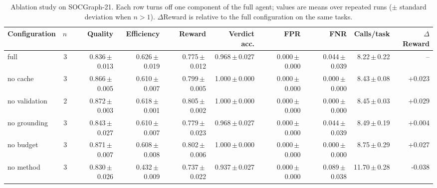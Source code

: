 \begin{table}[t]\centering\footnotesize
\caption{Ablation study on SOCGraph-21. Each row turns off one component of the full agent; values are means over repeated runs ($\pm$ standard deviation when $n>1$). $\Delta$Reward is relative to the full configuration on the same tasks.}
\label{tab:ablation}
\begin{tabular}{@{}l r rrrrrrr r@{}}\toprule
Configuration & $n$ & Quality & Efficiency & Reward & Verdict acc. & FPR & FNR & Calls/task & $\Delta$Reward\\\midrule
full & 3 & 0.836\,$\pm$\,0.013 & 0.626\,$\pm$\,0.019 & 0.775\,$\pm$\,0.012 & 0.968\,$\pm$\,0.027 & 0.000\,$\pm$\,0.000 & 0.044\,$\pm$\,0.039 & 8.22\,$\pm$\,0.22 & --\\
no cache & 3 & 0.866\,$\pm$\,0.005 & 0.610\,$\pm$\,0.007 & 0.799\,$\pm$\,0.005 & 1.000\,$\pm$\,0.000 & 0.000\,$\pm$\,0.000 & 0.000\,$\pm$\,0.000 & 8.43\,$\pm$\,0.08 & +0.023\\
no validation & 2 & 0.872\,$\pm$\,0.003 & 0.618\,$\pm$\,0.001 & 0.805\,$\pm$\,0.002 & 1.000\,$\pm$\,0.000 & 0.000\,$\pm$\,0.000 & 0.000\,$\pm$\,0.000 & 8.45\,$\pm$\,0.03 & +0.029\\
no grounding & 3 & 0.843\,$\pm$\,0.027 & 0.610\,$\pm$\,0.007 & 0.779\,$\pm$\,0.023 & 0.968\,$\pm$\,0.027 & 0.000\,$\pm$\,0.000 & 0.044\,$\pm$\,0.039 & 8.49\,$\pm$\,0.19 & +0.004\\
no budget & 3 & 0.871\,$\pm$\,0.007 & 0.608\,$\pm$\,0.008 & 0.802\,$\pm$\,0.006 & 1.000\,$\pm$\,0.000 & 0.000\,$\pm$\,0.000 & 0.000\,$\pm$\,0.000 & 8.75\,$\pm$\,0.29 & +0.027\\
no method & 3 & 0.830\,$\pm$\,0.026 & 0.432\,$\pm$\,0.009 & 0.737\,$\pm$\,0.022 & 0.937\,$\pm$\,0.027 & 0.000\,$\pm$\,0.000 & 0.089\,$\pm$\,0.038 & 11.70\,$\pm$\,0.28 & -0.038\\
\bottomrule\end{tabular}\end{table}
